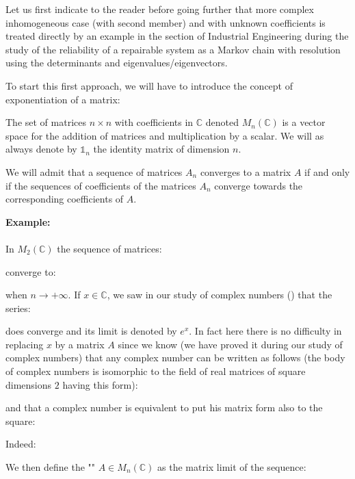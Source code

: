 	Let us first indicate to the reader before going further that more complex inhomogeneous case (with second member) and with unknown coefficients is treated directly by an example in the section of Industrial Engineering during the study of the reliability of a repairable system as a Markov chain with resolution using the determinants and eigenvalues/eigenvectors.
	
	To start this first approach, we will have to introduce the concept of exponentiation of a matrix:

	The set of matrices $n \times n$ with coefficients in $\mathbb{C}$ denoted $M_n(\mathbb{C})$ is a vector space for the addition of matrices and multiplication by a scalar. We will as always denote by $\mathds{1}_n$ the identity matrix of dimension $n$.
	
	We will admit that a sequence of matrices $A_n$ converges to a matrix $A$ if and only if the sequences of coefficients of the matrices $A_n$ converge towards the corresponding coefficients of $A$.
	
	\begin{tcolorbox}[colframe=black,colback=white,sharp corners]
	\textbf{{\Large {}}Example:}\\\\
	In $M_2(\mathbb{C})$ the sequence of matrices:
	
	converge to:
	
	when $n\rightarrow +\infty$.
	If $x\in \mathbb{C}$, we saw in our study of complex numbers () that the series:	
	
	does converge and its limit is denoted by $e^x$. In fact here there is no difficulty in replacing $x$ by a matrix $A$ since we know (we have proved it during our study of complex numbers) that any complex number can be written as follows (the body of complex numbers is isomorphic to the field of real matrices of square dimensions $2$ having this form):
	
	\end{tcolorbox}
	\pagebreak
	\begin{tcolorbox}[colframe=black,colback=white,sharp corners]
	and that a complex number is equivalent to put his matrix form also to the square:
	
	Indeed:
	
	\end{tcolorbox}
	We then define the "\label{exponential of a matrix}" $A\in M_n(\mathbb{C})$ as the matrix limit of the sequence:
	

